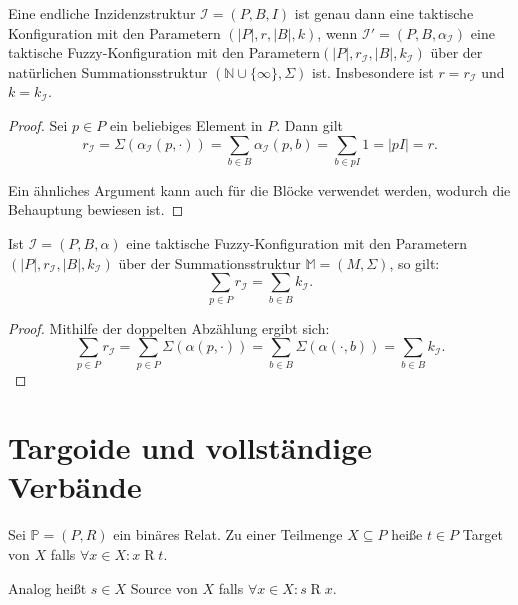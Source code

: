 \documentclass{article}
\begin{document}
\begin{theorem}
  Eine endliche Inzidenzstruktur $\mathcal{I} = (P, B, I)$ ist genau dann eine taktische Konfiguration mit den Parametern $(|P|, r, |B|, k)$,
  wenn $\mathcal{I'} = (P, B, \alpha_{\mathcal{I}})$ eine taktische Fuzzy-Konfiguration mit den Parametern$(|P|, r_\mathcal{I}, |B|, k_\mathcal{I})$
  über der natürlichen Summationsstruktur $(\mathbb{N} \cup \{\infty\}, \Sigma)$ ist.
  Insbesondere ist $r = r_\mathcal {I}$ und $k = k_\mathcal{I}$.
\end{theorem}
\begin{proof}
  Sei $p \in P$ ein beliebiges Element in $P$.
  Dann gilt
  \begin{equation*}
    r_\mathcal{I} = \Sigma(\alpha_\mathcal{I}(p, \cdot)) 
    = \sum_{b \in B}\alpha_\mathcal{I}(p, b)
    = \sum_{b \in pI}1 = |pI| = r.
  \end{equation*}

  Ein ähnliches Argument kann auch für die Blöcke verwendet werden, wodurch die Behauptung bewiesen ist.
\end{proof}

\begin{theorem}
  Ist $\mathcal{I} = (P, B, \alpha)$ eine taktische Fuzzy-Konfiguration mit den Parametern $(|P|, r_\mathcal{I}, |B|, k_\mathcal{I})$ über der Summationsstruktur $\mathbb{M} = (M, \Sigma)$, so gilt:
  \begin{equation*}
    \sum_{p \in P}r_\mathcal{I} = \sum_{b \in B}k_\mathcal{I}.
  \end{equation*}
\end{theorem}
\begin{proof}
  Mithilfe der doppelten Abzählung ergibt sich:
  \begin{equation*}
    \sum_{p \in P}r_\mathcal{I} = \sum_{p \in P}\Sigma(\alpha(p, \cdot)) = \sum_{b \in B}\Sigma(\alpha(\cdot, b)) = \sum_{b \in B}k_\mathcal{I}.
  \end{equation*}  
\end{proof}

\newpage
\section{Targoide und vollständige Verbände}

\begin{definition}
  Sei $\mathbb{P} = (P, R)$ ein binäres Relat.
  Zu einer Teilmenge $X \subseteq P$ heiße $t \in P$ Target von $X$ falls
  $\forall x \in X \colon x \mathrel{R} t$.

  Analog heißt $s \in X$ Source von $X$ falls
  $\forall x \in X \colon s \mathrel{R} x$.
\end{definition}
\end{document}

